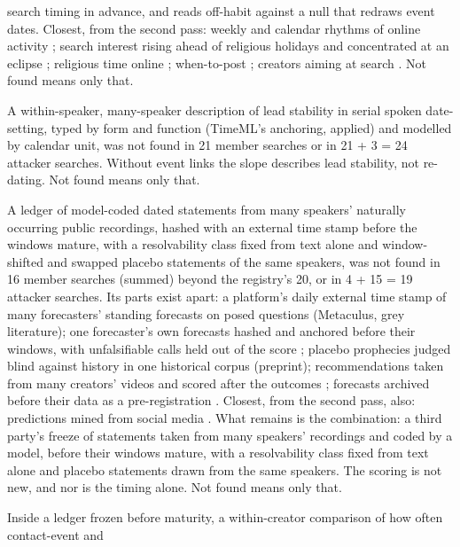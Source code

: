 {\begin{description}
search timing in advance, and reads off-habit against a null that redraws event dates. Closest, from the second
pass: weekly and calendar rhythms of online activity \cite{p12alshehhi2017investigate,p12alshehhi2019arabia}; search interest
rising ahead of religious holidays and concentrated at an eclipse \cite{p12dewi2026google,p12javed2026eclipse};
religious time online \cite{p12thomas2019sacred}; when-to-post \cite{p12spasojevic2015when}; creators aiming at search
\cite{p12hodl2023content}. Not found means only that.
\item[N20.] A within-speaker, many-speaker description of lead stability in serial spoken date-setting, typed by form
and function (TimeML's anchoring, applied) and modelled by calendar unit, was not found in 21 member searches or in
21 + 3 = 24 attacker searches. Without event links the slope describes lead stability, not re-dating. Not found means
only that.
\item[N21.] A ledger of model-coded dated statements from many speakers' naturally occurring public recordings, hashed
with an external time stamp before the windows mature, with a resolvability class fixed from text alone and
window-shifted and swapped placebo statements of the same speakers, was not found in 16 member searches (summed) beyond
the registry's 20, or in 4 + 15 = 19 attacker searches. Its parts exist apart: a platform's daily external time stamp of
many forecasters' standing forecasts on posed questions (Metaculus, grey literature); one forecaster's own forecasts
hashed and anchored before their windows, with unfalsifiable calls held out of the score \cite{p12jyotish2026sealed};
placebo prophecies judged blind against history in one historical corpus \cite{p12kriger2026how} (preprint);
recommendations taken from many creators' videos and scored after the outcomes
\cite{p12galarnyk2025videoconviction,p12lalwani2026stock}; forecasts archived before their data as a
pre-registration \cite{p12white2019developing}. Closest, from the second pass, also: predictions mined from social
media \cite{p12uzzaman2012twitterpaul}. What remains is the combination: a third party's freeze of statements taken from
many speakers' recordings and coded by a model, before their windows mature, with a resolvability class fixed from text
alone and placebo statements drawn from the same speakers. The scoring is not new, and nor is the timing alone. Not
found means only that.
\item[N22.] Inside a ledger frozen before maturity, a within-creator comparison of how often contact-event and

\end{description}}
